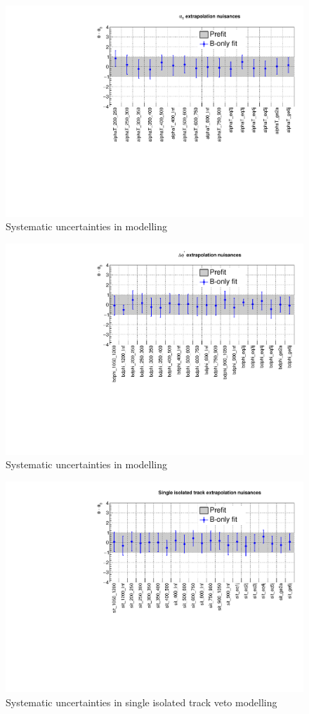 \clearpage
\begin{figure}[h!]
  \centering
  \caption{Systematic uncertainties in \alphat modelling}
  \includegraphics[width=0.8\linewidth]{figures/results/36invfb_preapproval/postfit/nuis/AlphaT_nuisances}
\end{figure}

\begin{figure}[h!]
  \centering
  \caption{Systematic uncertainties in \bdphi modelling}
  \includegraphics[width=0.8\linewidth]{figures/results/36invfb_preapproval/postfit/nuis/bDPhi_nuisances}
\end{figure}

\clearpage
\begin{figure}[h!]
  \centering
  \caption{Systematic uncertainties in single isolated track veto modelling}
  \includegraphics[width=0.8\linewidth]{figures/results/36invfb_preapproval/postfit/nuis/SIT_nuisances}
\end{figure}

